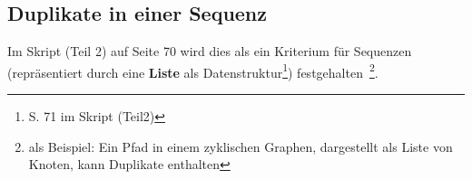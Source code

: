 \subsection*{Duplikate in einer Sequenz}

Im Skript (Teil 2) auf Seite 70 wird dies als ein Kriterium für Sequenzen (repräsentiert durch eine \textbf{Liste} als Datenstruktur\footnote{
S. 71 im Skript (Teil2)
}) festgehalten~\footnote{als Beispiel: Ein Pfad in einem zyklischen Graphen, dargestellt als Liste von Knoten, kann Duplikate enthalten}.